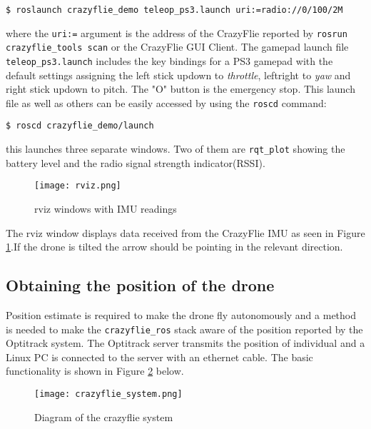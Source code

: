 \begin{mdframed}[backgroundcolor=light-gray, linecolor=light-gray]
\begin{verbatim}
$ roslaunch crazyflie_demo teleop_ps3.launch uri:=radio://0/100/2M
\end{verbatim}
\end{mdframed}
where the \texttt{uri:=} argument is the address of the CrazyFlie reported by \texttt{rosrun crazyflie\_tools scan} or the CrazyFlie GUI Client. The gamepad launch file \texttt{teleop\_ps3.launch} includes the key bindings for a PS3 gamepad with the default settings assigning the left stick up\/down to \textit{throttle}, left\/right to \textit{yaw} and right stick up\/down to pitch. The "O" button is the emergency stop. This launch file as well as others can be easily accessed by using the \texttt{roscd} command:
\begin{mdframed}[backgroundcolor=light-gray, linecolor=light-gray]
\begin{verbatim}
$ roscd crazyflie_demo/launch
\end{verbatim}
\end{mdframed}

\noindent this launches three separate windows. Two of them are \texttt{rqt\_plot} showing the battery level and the radio signal strength indicator(RSSI). 

\begin{figure}[H]
\centering
 \texttt{[image: rviz.png]}
 \caption{rviz windows with IMU readings}
 \label{figure:rviz_demo}
\end{figure}

The rviz window displays data received from the CrazyFlie IMU as seen in Figure \ref{figure:rviz_demo}.If the drone is tilted the arrow should be pointing in the relevant direction.

\subsection{Obtaining the position of the drone}
Position estimate is required to make the drone fly autonomously and a method is needed to make the \texttt{crazyflie\_ros} stack aware of the position reported by the Optitrack system. The Optitrack server transmits the position of individual and a Linux PC is connected to the server with an ethernet cable. The basic functionality is shown in Figure \ref{figure:diagram_crazyflie_system} below.

\label{section:ws3}
\begin{figure}[H]
\centering
 \texttt{[image: crazyflie\_system.png]}
 \caption{Diagram of the crazyflie system}
 \label{figure:diagram_crazyflie_system}
\end{figure}

